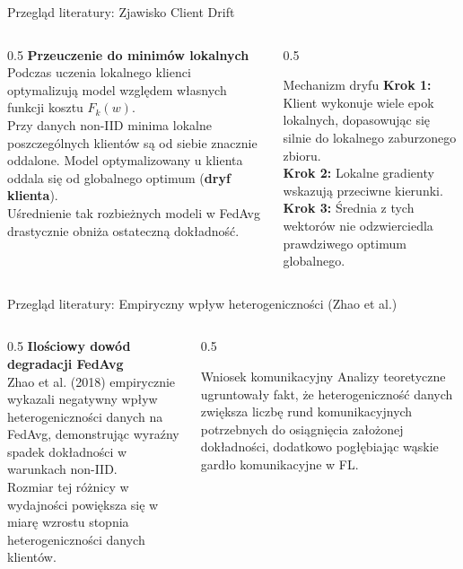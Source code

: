\documentclass[9pt,aspectratio=169]{beamer}
\begin{document}
\begin{frame}{Przegląd literatury: Zjawisko Client Drift}
\begin{columns}[T]
\begin{column}{0.5\textwidth}
\textbf{Przeuczenie do minimów lokalnych}\\[4pt]
Podczas uczenia lokalnego klienci optymalizują model względem własnych funkcji kosztu $F_k(w)$.\\[6pt]
Przy danych non-IID minima lokalne poszczególnych klientów są od siebie znacznie oddalone. Model optymalizowany u klienta oddala się od globalnego optimum (\textbf{dryf klienta}).\\[6pt]
Uśrednienie tak rozbieżnych modeli w FedAvg drastycznie obniża ostateczną dokładność.
\end{column}
\begin{column}{0.5\textwidth}
\begin{infobox}{Mechanizm dryfu}
\textbf{Krok 1:} Klient wykonuje wiele epok lokalnych, dopasowując się silnie do lokalnego zaburzonego zbioru.\\[3pt]
\textbf{Krok 2:} Lokalne gradienty wskazują przeciwne kierunki.\\[3pt]
\textbf{Krok 3:} Średnia z tych wektorów nie odzwierciedla prawdziwego optimum globalnego.
\end{infobox}
\end{column}
\end{columns}
\end{frame}

\begin{frame}{Przegląd literatury: Empiryczny wpływ heterogeniczności (Zhao et al.)}
\begin{columns}[T]
\begin{column}{0.5\textwidth}
\textbf{Ilościowy dowód degradacji FedAvg}\\[4pt]
Zhao et al. (2018) empirycznie wykazali negatywny wpływ heterogeniczności danych na FedAvg, demonstrując wyraźny spadek dokładności w warunkach non-IID.\\[6pt]
Rozmiar tej różnicy w wydajności powiększa się w miarę wzrostu stopnia heterogeniczności danych klientów.
\end{column}
\begin{column}{0.5\textwidth}
\begin{infoboxgreen}{Wniosek komunikacyjny}
Analizy teoretyczne ugruntowały fakt, że heterogeniczność danych zwiększa liczbę rund komunikacyjnych potrzebnych do osiągnięcia założonej dokładności, dodatkowo pogłębiając wąskie gardło komunikacyjne w FL.
\end{infoboxgreen}
\end{column}
\end{columns}
\end{frame}
\end{document}
